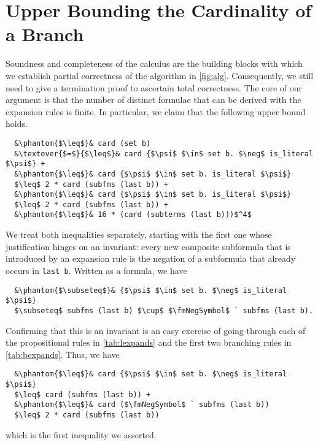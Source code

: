 \documentclass[sigplan,10pt,anonymous,review]{acmart}
\newcommand{\textover}[3][l]{%
 \makebox[\widthof{#3}][#1]{#2}%
}
\newcommand{\fmNegSymbol}{\boldsymbol{\neg}}
\begin{document}
\section{Upper Bounding the Cardinality of a Branch\label{sec:bound}}
Soundness and completeness of the calculus are the building blocks with which we establish partial correctness of the algorithm in \autoref{fig:alg}.
Consequently, we still need to give a termination proof to ascertain total correctness.
The core of our argument is that the number of distinct formulae that can be derived with the expansion rules is finite.
In particular, we claim that the following upper bound holds.
\begin{lstlisting}
  &\phantom{$\leq$}& card (set b)
  &\textover{$=$}{$\leq$}& card {$\psi$ $\in$ set b. $\neg$ is_literal $\psi$} +
  &\phantom{$\leq$}& card {$\psi$ $\in$ set b. is_literal $\psi$}
  $\leq$ 2 * card (subfms (last b)) +
  &\phantom{$\leq$}& card {$\psi$ $\in$ set b. is_literal $\psi$}
  $\leq$ 2 * card (subfms (last b)) +
  &\phantom{$\leq$}& 16 * (card (subterms (last b)))$^4$
\end{lstlisting}
We treat both inequalities separately, starting with the first one whose justification hinges on an invariant: 
every new composite subformula that is introduced by an expansion rule is the negation of a subformula that already occurs in \lstinline!last b!.
Written as a formula, we have
\begin{lstlisting}
  &\phantom{$\subseteq$}& {$\psi$ $\in$ set b. $\neg$ is_literal $\psi$}
  $\subseteq$ subfms (last b) $\cup$ $\fmNegSymbol$ ` subfms (last b).
\end{lstlisting}
Confirming that this is an invariant is an easy exercise of going through each of the propositional rules in \autoref{tab:lexpands} and the first two branching rules in \autoref{tab:bexpands}.
Thus, we have
\begin{lstlisting}
  &\phantom{$\leq$}& card {$\psi$ $\in$ set b. $\neg$ is_literal $\psi$}
  $\leq$ card (subfms (last b)) +
  &\phantom{$\leq$}& card ($\fmNegSymbol$ ` subfms (last b))
  $\leq$ 2 * card (subfms (last b))
\end{lstlisting}
which is the first inequality we asserted. 
\end{document}
